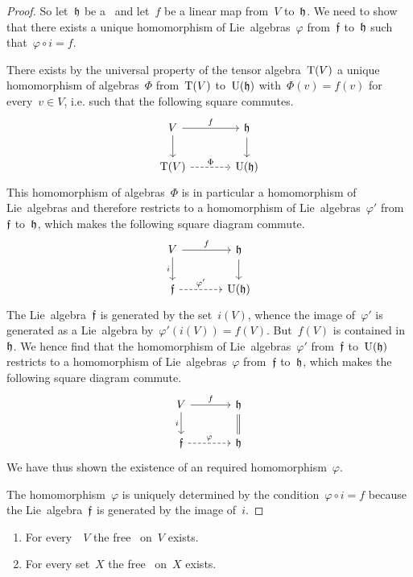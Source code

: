 \begin{proof}
	So let~$\mathfrak{h}$ be a~\liealgebra{$\kf$} and let~$f$ be a linear map from~$V$ to~$\mathfrak{h}$.
	We need to show that there exists a unique homomorphism of Lie~algebras~$\varphi$ from~$\mathfrak{f}$ to~$\mathfrak{h}$ such that~$\varphi \circ i = f$.

	There exists by the universal property of the tensor algebra~$\operatorname{T}(V)$ a unique homomorphism of algebras~$\Phi$ from~$\operatorname{T}(V)$ to~$\operatorname{U}(\mathfrak{h})$ with~$\Phi(v) = f(v)$ for every~$v \in V$, i.e. such that the following square commutes.
	\[
		\begin{tikzcd}[column sep = large]
			V
			\arrow{r}[above]{f}
			\arrow{d}
			&
			\hlie
			\arrow{d}
			\\
			\Tensor(V)
			\arrow[dashed]{r}[above]{\Phi}
			&
			\Univ(\hlie)
		\end{tikzcd}
	\]
	This homomorphism of algebras~$\Phi$ is in particular a homomorphism of Lie~algebras and therefore restricts to a homomorphism of Lie~algebras~$\varphi'$ from~$\mathfrak{f}$ to~$\mathfrak{h}$, which makes the following square diagram commute.
	\[
		\begin{tikzcd}[column sep = large]
			V
			\arrow{r}[above]{f}
			\arrow{d}[left]{i}
			&
			\hlie
			\arrow{d}
			\\
			\flie
			\arrow[dashed]{r}[above]{\varphi'}
			&
			\Univ(\hlie)
		\end{tikzcd}
	\]
	The Lie~algebra~$\mathfrak{f}$ is generated by the set~$i(V)$, whence the image of~$\varphi'$ is generated as a Lie~algebra by~$\varphi'(i(V)) = f(V)$.
	But~$f(V)$ is contained in~$\mathfrak{h}$.
	We hence find that the homomorphism of Lie~algebras~$\varphi'$ from~$\mathfrak{f}$ to~$\operatorname{U}(\mathfrak{h})$ restricts to a homomorphism of Lie~algebras~$\varphi$ from~$\mathfrak{f}$ to~$\mathfrak{h}$, which makes the following square diagram commute.
	\[
		\begin{tikzcd}[column sep = large]
			V
			\arrow{r}[above]{f}
			\arrow{d}[left]{i}
			&
			\hlie
			\arrow[equal]{d}
			\\
			\flie
			\arrow[dashed]{r}[above]{\varphi}
			&
			\hlie
		\end{tikzcd}
	\]
	We have thus shown the existence of an required homomorphism~$\varphi$.

	The homomorphism~$\varphi$ is uniquely determined by the condition~$\varphi \circ i = f$ because the Lie~algebra~$\mathfrak{f}$ is generated by the image of~$i$.
\end{proof}


\begin{corollary}
	\leavevmode
	\begin{enumerate}
		\item
			For every~\vectorspace{$\kf$}~$V$ the free~\liealgebra{$\kf$} on~$V$ exists.
		\item
			For every set~$X$ the free~\liealgebra{$\kf$} on~$X$ exists.
	\end{enumerate}
\end{corollary}


